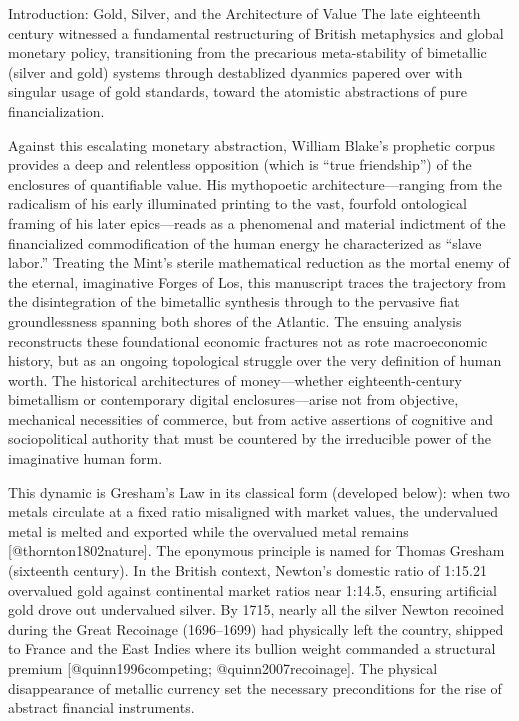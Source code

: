 \documentclass[
  ignorenonframetext,
]{beamer}
\author{\texorpdfstring{}{}}
\date{}
\begin{document}
\begin{frame}{Introduction: Gold, Silver, and the Architecture of Value}
\protect{}\label{introduction-gold-silver-and-the-architecture-of-value}
The late eighteenth century witnessed a fundamental restructuring of
British metaphysics and global monetary policy, transitioning from the
precarious meta-stability of bimetallic (silver and gold) systems
through destablized dyanmics papered over with singular usage of gold
standards, toward the atomistic abstractions of pure financialization.

Against this escalating monetary abstraction, William Blake's prophetic
corpus provides a deep and relentless opposition (which is ``true
friendship'') of the enclosures of quantifiable value. His mythopoetic
architecture---ranging from the radicalism of his early illuminated
printing to the vast, fourfold ontological framing of his later
epics---reads as a phenomenal and material indictment of the
financialized commodification of the human energy he characterized as
``slave labor.'' Treating the Mint's sterile mathematical reduction as
the mortal enemy of the eternal, imaginative Forges of Los, this
manuscript traces the trajectory from the disintegration of the
bimetallic synthesis through to the pervasive fiat groundlessness
spanning both shores of the Atlantic. The ensuing analysis reconstructs
these foundational economic fractures not as rote macroeconomic history,
but as an ongoing topological struggle over the very definition of human
worth. The historical architectures of money---whether
eighteenth-century bimetallism or contemporary digital
enclosures---arise not from objective, mechanical necessities of
commerce, but from active assertions of cognitive and sociopolitical
authority that must be countered by the irreducible power of the
imaginative human form.

This dynamic is Gresham's Law in its classical form (developed below):
when two metals circulate at a fixed ratio misaligned with market
values, the undervalued metal is melted and exported while the
overvalued metal remains {[}@thornton1802nature{]}. The eponymous
principle is named for Thomas Gresham (sixteenth century). In the
British context, Newton's domestic ratio of 1:15.21 overvalued gold
against continental market ratios near 1:14.5, ensuring artificial gold
drove out undervalued silver. By 1715, nearly all the silver Newton
recoined during the Great Recoinage (1696--1699) had physically left the
country, shipped to France and the East Indies where its bullion weight
commanded a structural premium {[}@quinn1996competing;
@quinn2007recoinage{]}. The physical disappearance of metallic currency
set the necessary preconditions for the rise of abstract financial
instruments.


\end{frame}
\end{document}
